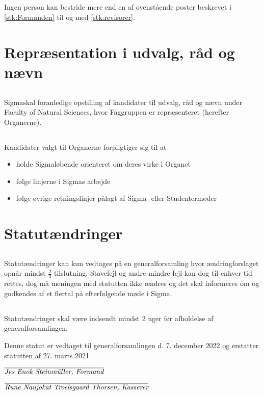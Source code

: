 \documentclass[danish,a4paper,twocolumn]{article}
\newcommand{\foreningen}{Sigma}
\newcommand{\fakultetet}{Faculty of Natural Sciences}
\begin{document}
\subsection{}Ingen person kan bestride mere end en af ovenstående poster beskrevet i \ref{stk:Formanden} til og med \ref{stk:revisorer}.

\section{Repræsentation i udvalg, råd og nævn}
\subsection{}\foreningen skal foranledige opstilling af kandidater til udvalg, råd og nævn under \fakultetet, hvor Faggruppen er repræsenteret (herefter Organerne).

\subsection{}Kandidater valgt til Organerne forpligtiger sig til at
\begin{itemize}
        \item holde \foreningen løbende orienteret om deres virke i Organet
        \item følge linjerne i \foreningen s arbejde
        \item følge øvrige retningslinjer pålagt af \foreningen- eller Studentermøder
\end{itemize}

\section{Statutændringer}\label{par:aendringer}
\subsection{}Statutændringer kan kun vedtages på en generalforsamling hvor ændringforslaget opnår mindst $\frac{2}{3}$ tilslutning. Stavefejl og andre mindre fejl kan dog til enhver tid rettes, dog må meningen med statutten ikke ændres og det skal informeres om og godkendes af et flertal på efterfølgende møde i \foreningen.

\subsection{}Statutændringer skal være indsendt mindst 2 uger før afholdelse af generalforsamlingen.

\vspace{2cm}
Denne statut er vedtaget til generalforsamlingen d. 7. december 2022 og erstatter statutten af 27. marts 2021

\vspace{0.5cm}
$\overline{\emph{Jes Enok Steinmüller, Formand}}$

\vspace{0.1cm}
$\overline{\emph{Rune Naujokat Troelsgaard Thorsen, Kasserer}}$
\end{document}
